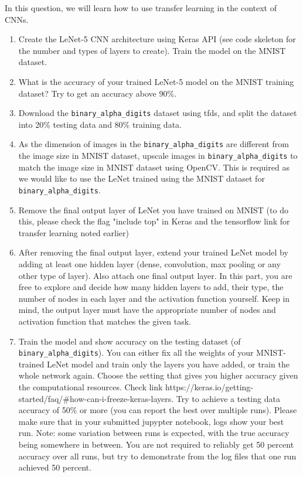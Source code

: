 \item In this question, we will learn how to use transfer learning in the context of CNNs.

\begin{enumerate}
  \item Create the LeNet-5 CNN architecture using Keras API (see code skeleton for the number
        and types of layers to create). Train the model on the MNIST dataset.
  \item What is the accuracy of your trained LeNet-5 model on the MNIST training dataset? Try
        to get an accuracy above 90\%.
  \item Download the \lstinline{binary_alpha_digits} dataset using tfds, and split the dataset into 20\%
        testing data and 80\% training data.
  \item As the dimension of images in the \lstinline{binary_alpha_digits} are different from the image size in MNIST dataset, upscale images in \lstinline{binary_alpha_digits} to match the image size in MNIST dataset using OpenCV. This is required as we would like to use the LeNet trained using the MNIST dataset for \lstinline{binary_alpha_digits}.
  \item Remove the final output layer of LeNet you have trained on MNIST (to do this, please check the flag "include top" in Keras and the tensorflow link for transfer learning noted earlier)
  \item After removing the final output layer, extend your trained LeNet model by adding at least one hidden layer (dense, convolution, max pooling or any other type of layer). Also attach one final output layer. In this part, you are free to explore and decide how many hidden layers to add, their type, the number of nodes in each layer and the activation function yourself. Keep in mind, the output layer must have the appropriate number of nodes and activation function that matches the given task.
  \item Train the model and show accuracy on the testing dataset (of \lstinline{binary_alpha_digits}). You can either fix all the weights of your MNIST-trained LeNet model and train only the layers you have added, or train the whole network again. Choose the setting that gives you higher accuracy given the computational resources. Check link https://keras.io/getting-started/faq/\#how-can-i-freeze-keras-layers. Try to achieve a testing data accuracy of 50\% or more (you can report the best over multiple runs). Please make sure that in your submitted jupypter notebook, logs show your best run. Note: some variation between runs is expected, with the true accuracy being somewhere in between. You are not required to reliably get 50 percent accuracy over all runs, but try to demonstrate from the log files that one run achieved 50 percent.
\end{enumerate}
